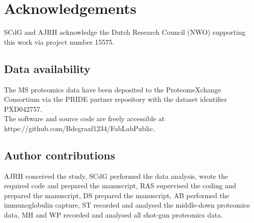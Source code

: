 \section{Acknowledgements}
SCdG and AJRH acknowledge the Dutch Research Council (NWO) supporting this work via project number 15575.


\subsection{Data availability}
The MS proteomics data have been deposited to the ProteomeXchange Consortium via the PRIDE \cite{perez-riverol2022pride} partner repository with the dataset identifier PXD042757.\\
The software and source code are freely accessible at\\
https://github.com/Bdegraaf1234/FabLabPublic.

\subsection{Author contributions}
AJRH conceived the study, SCdG performed the data analysis, wrote the required code and prepared the manuscript, RAS supervised the coding and prepared the manuscript, DS prepared the manuscript, AB performed the immunoglobulin capture, ST recorded and analysed the middle-down proteomics data, MH and WP recorded and analysed all shot-gun proteomics data.



